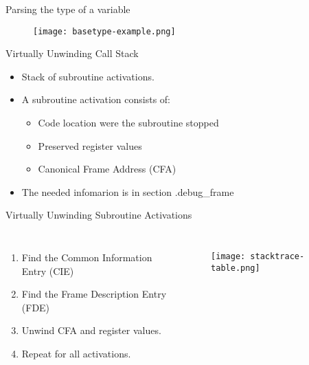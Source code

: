 \begin{frame}{Parsing the type of a variable}
	\begin{figure}
		\texttt{[image: basetype-example.png]}
	\end{figure}
\end{frame}


\begin{frame}{Virtually Unwinding Call Stack}
    \begin{itemize}
        \item Stack of subroutine activations.
        \item A subroutine activation consists of:
    	\begin{itemize}
    	    \item Code location were the subroutine stopped
    	    \item Preserved register values
	    \item Canonical Frame Address (CFA)
    	\end{itemize}
        \item The needed infomarion is in section .debug\_frame
    \end{itemize}
\end{frame}


\begin{frame}{Virtually Unwinding Subroutine Activations}
    \begin{columns}[c] %

        \begin{enumerate}
        	\item Find the Common Information Entry (CIE)
		\item Find the Frame Description Entry (FDE)
		\item Unwind CFA and register values.
		\item Repeat for all activations.
        \end{enumerate}

	\begin{figure}
		\texttt{[image: stacktrace-table.png]}
	\end{figure}
    \end{columns}

\end{frame}


